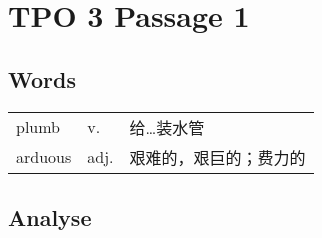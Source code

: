 \section{TPO 3 Passage 1}

\subsection{Words}

\begin{tabular}{lll}
    plumb   & v.   & 给…装水管       \\
    arduous & adj. & 艰难的，艰巨的；费力的 \\
\end{tabular}

\subsection{Analyse}

